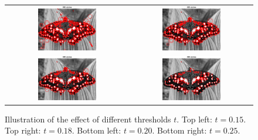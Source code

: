 \begin{figure}[h]
	\centering
	\begin{tabular}{cc}
	\includegraphics[width=0.5\textwidth]{figures/a3_butterfly_k015.png} &
	\includegraphics[width=0.5\textwidth]{figures/a3_butterfly_k018.png} \\
	\includegraphics[width=0.5\textwidth]{figures/a3_butterfly_k020.png} &
	\includegraphics[width=0.5\textwidth]{figures/a3_butterfly_k025.png} \\
	\end{tabular}
	\caption{Illustration of the effect of different thresholds $t$. Top left: $t=0.15$. Top right: $t=0.18$. Bottom left: $t=0.20$. Bottom right: $t=0.25$.}
	\label{fig:a3:thresholds}
\end{figure}


